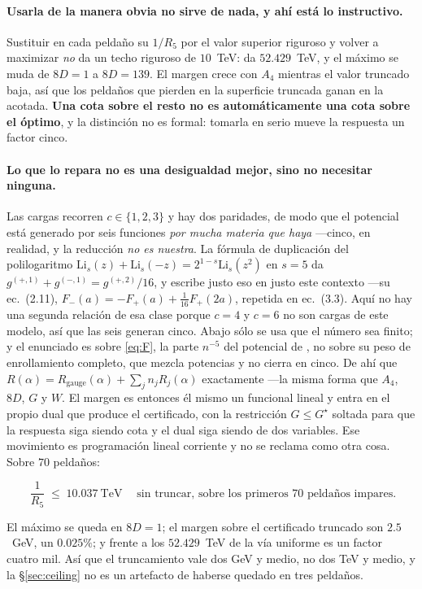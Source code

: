 \documentclass[11pt,a4paper]{article}
\newenvironment{keyeq}
  {\begin{center}\setlength{\fboxsep}{9pt}\setlength{\fboxrule}{0.8pt}%
   \begin{lrbox}{\keyeqbox}\begin{minipage}{0.88\textwidth}}
  {\end{minipage}\end{lrbox}%
   \fcolorbox{hdrblue!55}{hdrblue!6}{\usebox{\keyeqbox}}\end{center}}
\begin{document}
\paragraph{Usarla de la manera obvia no sirve de nada, y ahí está lo instructivo.} Sustituir en cada
peldaño su $1/R_5$ por el valor superior riguroso y volver a maximizar \emph{no} da un techo
riguroso de $10$~TeV: da $52.429$~TeV, y el máximo se muda de $8D=1$ a $8D=139$. El margen crece con
$A_4$ mientras el valor truncado baja, así que los peldaños que pierden en la superficie truncada
ganan en la acotada. \textbf{Una cota sobre el resto no es automáticamente una cota sobre el
óptimo}, y la distinción no es formal: tomarla en serio mueve la respuesta un factor cinco.

\paragraph{Lo que lo repara no es una desigualdad mejor, sino no necesitar ninguna.} Las cargas
recorren $c\in\{1,2,3\}$ y hay dos paridades, de modo que el potencial está generado por seis
funciones \emph{por mucha materia que haya} ---cinco, en realidad, y la reducción \emph{no es
nuestra}. La fórmula de duplicación del polilogaritmo
$\mathrm{Li}_s(z)+\mathrm{Li}_s(-z)=2^{1-s}\mathrm{Li}_s(z^2)$ \cite{Wood} en $s=5$ da
$g^{(+,1)}+g^{(-,1)}=g^{(+,2)}/16$, y \cite{CCD24} escribe justo eso en justo este contexto ---su
ec.~(2.11), $F_-(a)=-F_+(a)+\tfrac1{16}F_+(2a)$, repetida en \cite{Cac25} ec.~(3.3). Aquí no hay
una segunda relación de esa clase porque $c=4$ y $c=6$ no son cargas de este modelo, así que las
seis generan cinco. Abajo sólo se usa que el número sea finito; y el enunciado es sobre
\eqref{eq:F}, la parte $n^{-5}$ del potencial de \cite{KM25}, no sobre su peso de enrollamiento
completo, que mezcla potencias y no cierra en cinco. De ahí que
$R(\alpha)=R_{\text{gauge}}(\alpha)+\sum_j n_j R_j(\alpha)$ exactamente ---la misma forma que
$A_4$, $8D$, $G$ y $W$. El margen es entonces él mismo un funcional lineal y entra en el propio dual
que produce el certificado, con la restricción $G\le G^\star$ soltada para que la respuesta siga
siendo cota y el dual siga siendo de dos variables. Ese movimiento es programación lineal corriente
\cite{Schrijver} y no se reclama como otra cosa. Sobre $70$ peldaños:
\begin{keyeq}
\begin{equation}\label{eq:rigorousceiling}
  \boxed{\;\frac{1}{R_5}\;\le\;10.037\ \text{TeV}\;}
  \quad\text{sin truncar, sobre los primeros $70$ peldaños impares.}
\end{equation}
\end{keyeq}
\noindent El máximo se queda en $8D=1$; el margen sobre el certificado truncado son $2.5$~GeV, un
$0.025\%$; y frente a los $52.429$~TeV de la vía uniforme es un factor cuatro mil. Así que el
truncamiento vale dos GeV y medio, no dos TeV y medio, y la \S\ref{sec:ceiling} no es un artefacto
de haberse quedado en tres peldaños.
\end{document}
